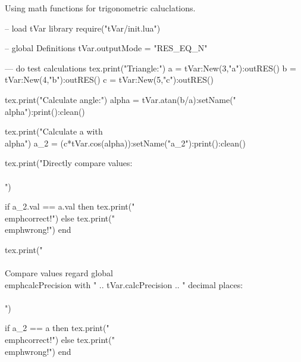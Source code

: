 \documentclass{article}
\begin{document}
Using math functions for trigonometric caluclations.\\
\begin{luacode}
	-- load tVar library
	require("tVar/init.lua")
	  
	-- global Definitions
	tVar.outputMode = "RES_EQ_N"
	
	--- do test calculations
	tex.print("Triangle:")
	a = tVar:New(3,"a"):outRES()
	b = tVar:New(4,"b"):outRES()
	c = tVar:New(5,"c"):outRES()
	
	tex.print("Calculate angle:")
	alpha = tVar.atan(b/a):setName("\\alpha"):print():clean()
	
	tex.print("Calculate a with \\alpha")
	a_2 = (c*tVar.cos(alpha)):setName("a_{2}"):print():clean()
	
	tex.print("Directly compare values:\\\\")
	
	if a_2.val == a.val then
		tex.print("\\emph{correct!}")
	else
		tex.print("\\emph{wrong!}")
	end
	
	tex.print("\\\\Compare values regard global \\emph{calcPrecision} with " .. tVar.calcPrecision .. " decimal places:\\\\")
	
	if a_2 == a then
		tex.print("\\emph{correct!}")
	else
		tex.print("\\emph{wrong!}")
	end
\end{luacode}
\end{document}
